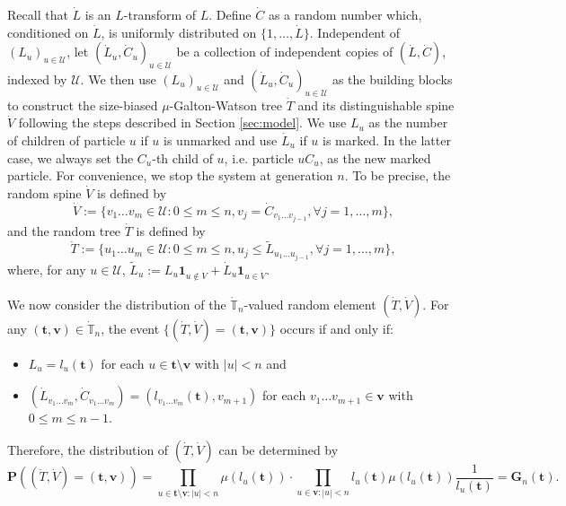 \documentclass[12pt,a4paper]{amsart}
\numberwithin{equation}{section}
\begin{document}
	Recall that $\dot L$ is an $L$-transform of $L$.
	Define $\dot C$ as a random number which, conditioned on $\dot L$, is uniformly distributed on $\{1,\dots,\dot L\}$.
	Independent of $(L_u)_{u\in\mathcal U}$, let $(\dot L_u,\dot C_u)_{u\in \mathcal U}$ be a collection of independent copies of $(\dot L,\dot C)$, indexed by $\mathcal U$.
	We then use $(L_u)_{u\in\mathcal U}$ and $(\dot L_u,\dot C_u)_{u\in\mathcal U}$ as the building blocks to construct the size-biased $\mu$-Galton-Watson tree $\dot T$ and its distinguishable spine $\dot V$ following the steps described in Section \ref{sec:model}.
	We use $L_u$ as the number of children of particle $u$ if $u$ is unmarked and use $\dot L_u$ if $u$ is marked.
	In the latter case, we always set the $C_u$-th child of $u$, i.e. particle $uC_u$, as the new marked particle.
	For convenience, we stop the system at generation $n$. To be precise, the random spine $\dot V$ is defined by
\begin{equation*}
		\dot V
	:=\{v_1\dots v_m\in \mathcal U:0\le m\le n, v_j=\dot C_{v_1\dots v_{j-1}},\forall j=1,\dots,m\},
\end{equation*}
	and the random tree $\dot T$ is defined by
\begin{equation*}
		\dot T
	:=\{u_1\dots u_m\in\mathcal U: 0\le m\le n,u_j\leq \tilde L_{u_1\dots u_{j-1}},\forall j=1,\dots,m\},
\end{equation*}
	where, for any $u\in\mathcal U$, $\tilde L_u:=L_u\mathbf 1_{u\not\in \dot V}+\dot L_u\mathbf 1_{u\in \dot V}$.

	We now consider the distribution of the $\dot{\mathbb T}_n$-valued random element $(\dot T,\dot V)$.
	For any $( \mathbf t , \mathbf v)\in\dot{\mathbb T}_n$, the event $\{(\dot T,\dot V)=( \mathbf t , \mathbf v)\}$ occurs if and only if:
\begin{itemize}
\item
    $L_u=l_u( \mathbf t )$ for each $u\in  \mathbf t \setminus \mathbf v$ with $| u |<n$ and
\item
	$(\dot L_{v_1\dots v_m},\dot C_{v_1\dots v_m})=(l_{v_1\dots v_m}( \mathbf t ),v_{m+1})$ for each $v_1\dots v_{m+1}\in \mathbf v$ with $0\le m\le n-1$.
\end{itemize}
    Therefore, the distribution of $(\dot T,\dot V)$ can be determined by
\begin{equation}
\label{eq:treespinemeasure}
		\mathbf P((\dot T,\dot V)=( \mathbf t , \mathbf v))
	=\prod_{u\in  \mathbf t \setminus \mathbf v:|u|<n}\mu(l_u( \mathbf t ))
	\cdot \prod_{u\in  \mathbf v:| u| <n}l_u( \mathbf t )\mu(l_u( \mathbf t ))\frac{1}{l_u( \mathbf t )}
	= \mathbf G_n( \mathbf t ).
\end{equation}
	
\end{document}
